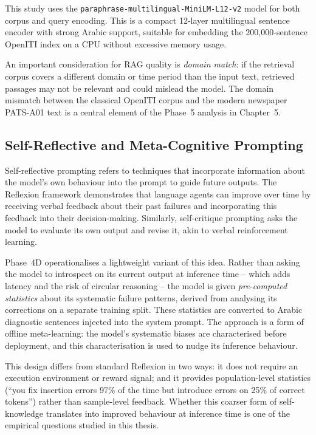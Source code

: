 \noindent
This study uses the \texttt{paraphrase-multilingual-MiniLM-L12-v2} model
\cite{reimers2019sentence} for both corpus and query encoding.
This is a compact 12-layer multilingual sentence encoder with strong Arabic
support, suitable for embedding the 200,000-sentence OpenITI index on a CPU
without excessive memory usage.

An important consideration for RAG quality is \emph{domain match}: if the
retrieval corpus covers a different domain or time period than the input text,
retrieved passages may not be relevant and could mislead the model.
The domain mismatch between the classical OpenITI corpus and the modern
newspaper PATS-A01 text is a central element of the Phase~5 analysis in
Chapter~5.

\subsection{Self-Reflective and Meta-Cognitive Prompting}
\label{subsec:self_reflective}

Self-reflective prompting refers to techniques that incorporate information
about the model's own behaviour into the prompt to guide future outputs.
The Reflexion framework \cite{shinn2023reflexion} demonstrates that language
agents can improve over time by receiving verbal feedback about their past
failures and incorporating this feedback into their decision-making.
Similarly, self-critique prompting asks the model to evaluate its own output
and revise it, akin to verbal reinforcement learning.

Phase~4D operationalises a lightweight variant of this idea.
Rather than asking the model to introspect on its current output at inference
time -- which adds latency and the risk of circular reasoning -- the model is
given \emph{pre-computed statistics} about its systematic failure patterns,
derived from analysing its corrections on a separate training split.
These statistics are converted to Arabic diagnostic sentences injected into
the system prompt.
The approach is a form of offline meta-learning: the model's systematic biases
are characterised before deployment, and this characterisation is used to
nudge its inference behaviour.

This design differs from standard Reflexion in two ways:
it does not require an execution environment or reward signal;
and it provides population-level statistics (``you fix insertion errors 97\% of
the time but introduce errors on 25\% of correct tokens'') rather than
sample-level feedback.
Whether this coarser form of self-knowledge translates into improved behaviour
at inference time is one of the empirical questions studied in this thesis.

